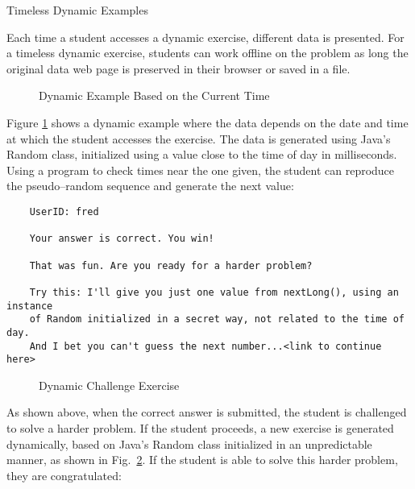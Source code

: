 \documentclass[12pt]{article}
\begin{document}
\newpage
Timeless Dynamic Examples
\vspace{11pt}

Each time a student accesses a dynamic exercise, different data is presented.
For a timeless dynamic exercise,
students can work offline on the problem as long the original
data web page is preserved in their browser or saved in a file.

\begin{figure}[ht]
\begin{center}
\caption{Dynamic Example Based on the Current Time}
\label{fig:RNG}
\end{center}
\end{figure}


\vspace{11pt}

Figure \ref{fig:RNG} shows a dynamic example
where the data depends on the date and time at which the student accesses the exercise.
The data is generated using Java's Random class, initialized using a value
close to the time of day in milliseconds.  Using a program to check times
near the one given, the student can reproduce the pseudo--random sequence
and generate the next value:

\begin{verbatim}
    UserID: fred

    Your answer is correct. You win!

    That was fun. Are you ready for a harder problem?

    Try this: I'll give you just one value from nextLong(), using an instance
    of Random initialized in a secret way, not related to the time of day.
    And I bet you can't guess the next number...<link to continue here>
\end{verbatim}

\begin{figure}[ht]
\begin{center}
\caption{Dynamic Challenge Exercise}
\label{fig:RNG1}
\end{center}
\end{figure}

\vspace{11pt}

As shown above, when the correct answer is submitted,
the student is challenged to solve a harder problem.  If the student proceeds,
a new exercise is generated dynamically, 
based on Java's Random class initialized in an unpredictable manner,
as shown in Fig.\ \ref{fig:RNG1}.
If the student is able to solve this harder problem, they are congratulated:
\end{document}
